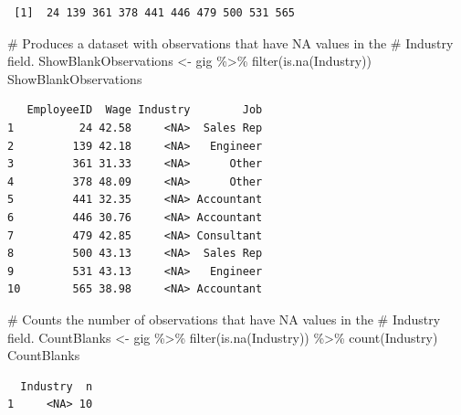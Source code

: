 \documentclass[
  letterpaper,
  DIV=11,
  numbers=noendperiod]{scrreprt}
\newenvironment{Shaded}{\begin{snugshade}}{\end{snugshade}}
\newcommand{\CommentTok}[1]{\textcolor[rgb]{0.37,0.37,0.37}{#1}}
\newcommand{\FunctionTok}[1]{\textcolor[rgb]{0.28,0.35,0.67}{#1}}
\newcommand{\NormalTok}[1]{\textcolor[rgb]{0.00,0.23,0.31}{#1}}
\newcommand{\OtherTok}[1]{\textcolor[rgb]{0.00,0.23,0.31}{#1}}
\newcommand{\SpecialCharTok}[1]{\textcolor[rgb]{0.37,0.37,0.37}{#1}}
\begin{document}
\begin{Shaded}
\end{Shaded}

\begin{verbatim}
 [1]  24 139 361 378 441 446 479 500 531 565
\end{verbatim}

\begin{Shaded}
\begin{Highlighting}[]
\CommentTok{\# Produces a dataset with observations that have NA values in the}
\CommentTok{\# Industry field.}
\NormalTok{ShowBlankObservations }\OtherTok{\textless{}{-}}\NormalTok{ gig }\SpecialCharTok{\%\textgreater{}\%}
    \FunctionTok{filter}\NormalTok{(}\FunctionTok{is.na}\NormalTok{(Industry))}
\NormalTok{ShowBlankObservations}
\end{Highlighting}
\end{Shaded}

\begin{verbatim}
   EmployeeID  Wage Industry        Job
1          24 42.58     <NA>  Sales Rep
2         139 42.18     <NA>   Engineer
3         361 31.33     <NA>      Other
4         378 48.09     <NA>      Other
5         441 32.35     <NA> Accountant
6         446 30.76     <NA> Accountant
7         479 42.85     <NA> Consultant
8         500 43.13     <NA>  Sales Rep
9         531 43.13     <NA>   Engineer
10        565 38.98     <NA> Accountant
\end{verbatim}

\begin{Shaded}
\begin{Highlighting}[]
\CommentTok{\# Counts the number of observations that have NA values in the}
\CommentTok{\# Industry field.}
\NormalTok{CountBlanks }\OtherTok{\textless{}{-}}\NormalTok{ gig }\SpecialCharTok{\%\textgreater{}\%}
    \FunctionTok{filter}\NormalTok{(}\FunctionTok{is.na}\NormalTok{(Industry)) }\SpecialCharTok{\%\textgreater{}\%}
    \FunctionTok{count}\NormalTok{(Industry)}
\NormalTok{CountBlanks}
\end{Highlighting}
\end{Shaded}

\begin{verbatim}
  Industry  n
1     <NA> 10
\end{verbatim}
\end{document}
